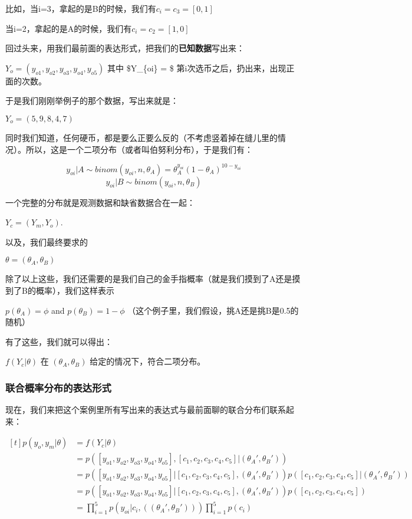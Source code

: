 \documentclass[11pt]{article}
\begin{document}
比如，当i=3，拿起的是B的时候，我们有\(c_{i} = c_{3} = [0,1]\)

当i=2，拿起的是A的时候，我们有\(c_{i} = c_{2} = [1,0]\)

回过头来，用我们最前面的表达形式，把我们的\textbf{已知数据}写出来：

\(Y_o = (y_{o1}, y_{o2}, y_{o3}, y_{o4}, y_{o5})\) 其中 \$Y\_\{oi\} = \$
第i次选币之后，扔出来，出现正面的次数。

于是我们刚刚举例子的那个数据，写出来就是：

\(Y_o = (5,9,8,4,7)\)

同时我们知道，任何硬币，都是要么正要么反的（不考虑竖着掉在缝儿里的情况）。所以，这是一个二项分布（或者叫伯努利分布），于是我们有：

\[y_{oi}|A \sim binom(y_{oi}, n, \theta_A) = \theta_A^{y_{oi}} (1-\theta_A)^{10-y_{oi}} \]\[y_{oi}|B \sim binom(y_{oi}, n, \theta_B)\]

一个完整的分布就是观测数据和缺省数据合在一起：

\(Y_c = (Y_m, Y_o)\).

以及，我们最终要求的

\(\theta = (\theta_A, \theta_B)\)

除了以上这些，我们还需要的是我们自己的金手指概率（就是我们摸到了A还是摸到了B的概率），我们这样表示

\(p(\theta_A) = \phi\) and \(p(\theta_B)= 1-\phi\)
（这个例子里，我们假设，挑A还是挑B是0.5的随机）

有了这些，我们就可以得出：

\(f(Y_c|\theta)\) 在 \((\theta_A, \theta_B)\)
给定的情况下，符合二项分布。

\subsubsection{联合概率分布的表达形式}\label{ux8054ux5408ux6982ux7387ux5206ux5e03ux7684ux8868ux8fbeux5f62ux5f0f}

现在，我们来把这个案例里所有写出来的表达式与最前面聊的联合分布们联系起来：

\[\begin{aligned}[t] p(y_o,y_m| \theta) &= f(Y_c|\theta)\\ &= p( [y_{o1},y_{o2},y_{o3},y_{o4},y_{o5}], [c_{1},c_{2},c_{3},c_{4},c_{5}] | (\theta_A', \theta_B')) \\ &= p( [y_{o1},y_{o2},y_{o3},y_{o4},y_{o5}] | [c_{1},c_{2},c_{3},c_{4},c_{5}] , (\theta_A', \theta_B')) p([c_{1},c_{2},c_{3},c_{4},c_{5}]| (\theta_A', \theta_B'))\\ &= p( [y_{o1},y_{o2},y_{o3},y_{o4},y_{o5}] | [c_{1},c_{2},c_{3},c_{4},c_{5}] , (\theta_A', \theta_B')) p([c_{1},c_{2},c_{3},c_{4},c_{5}]) \\ &= \prod_{i=1}^5 p(y_{oi}|c_i,( (\theta_A', \theta_B'))) \prod_{i=1}^5 p(c_i) \end{aligned}\]
\end{document}
